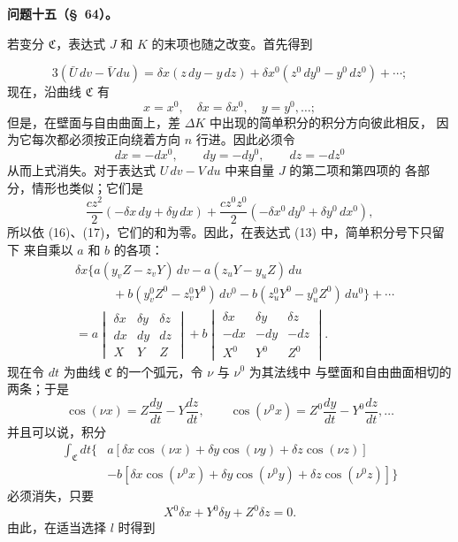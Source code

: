 \documentclass[11pt,a4paper,leqno]{article}
\begin{document}
\begin{center}
\textbf{问题十五（\S~64）。}
\end{center}

若变分 $\mathfrak{C}$，表达式 $J$ 和 $K$ 的末项也随之改变。首先得到

\[
3(\bar U\,dv-\bar V\,du)
=\delta x(z\,dy-y\,dz)
+\delta x^0(z^0\,dy^0-y^0\,dz^0)+\cdots;
\]
现在，沿曲线 $\mathfrak{C}$ 有
\begin{equation}\tag{16}
x=x^0,\quad \delta x=\delta x^0,\quad y=y^0,\ldots;
\end{equation}
但是，在壁面与自由曲面上，差 $\Delta K$ 中出现的简单积分的积分方向彼此相反，
因为它每次都必须按正向绕着方向 $n$ 行进。因此必须令
\begin{equation}\tag{17}
dx=-dx^0,\qquad dy=-dy^0,\qquad dz=-dz^0
\end{equation}
从而上式消失。对于表达式 $U\,dv-V\,du$ 中来自量 $J$ 的第二项和第四项的
各部分，情形也类似；它们是
\[
\frac{cz^2}{2}(-\delta x\,dy+\delta y\,dx)
+\frac{cz^0z^0}{2}(-\delta x^0\,dy^0+\delta y^0\,dx^0),
\]
所以依 (16)、(17)，它们的和为零。因此，在表达式 (13) 中，简单积分号下只留下
来自乘以 $a$ 和 $b$ 的各项：
\[
\begin{aligned}
&\delta x\{a(y_vZ-z_vY)\,dv-a(z_uY-y_uZ)\,du\\
&\qquad\quad+b(y_v^0Z^0-z_v^0Y^0)\,dv^0
-b(z_u^0Y^0-y_u^0Z^0)\,du^0\}+\cdots\\
&=a\begin{vmatrix}
\delta x&\delta y&\delta z\\
dx&dy&dz\\
X&Y&Z
\end{vmatrix}
+b\begin{vmatrix}
\delta x&\delta y&\delta z\\
-dx&-dy&-dz\\
X^0&Y^0&Z^0
\end{vmatrix}.
\end{aligned}
\]
现在令 $dt$ 为曲线 $\mathfrak{C}$ 的一个弧元，令 $\nu$ 与 $\nu^0$ 为其法线中
与壁面和自由曲面相切的两条；于是
\[
\cos(\nu x)=Z\frac{dy}{dt}-Y\frac{dz}{dt},\qquad
\cos(\nu^0x)=Z^0\frac{dy}{dt}-Y^0\frac{dz}{dt},\ldots
\]
并且可以说，积分
\[
\begin{aligned}
\int_{\mathfrak{C}}dt\{&a[\delta x\cos(\nu x)+\delta y\cos(\nu y)
+\delta z\cos(\nu z)]\\
&-b[\delta x\cos(\nu^0x)+\delta y\cos(\nu^0y)
+\delta z\cos(\nu^0z)]\}
\end{aligned}
\]
必须消失，只要
\[
X^0\delta x+Y^0\delta y+Z^0\delta z=0.
\]
由此，在适当选择 $l$ 时得到
\end{document}
